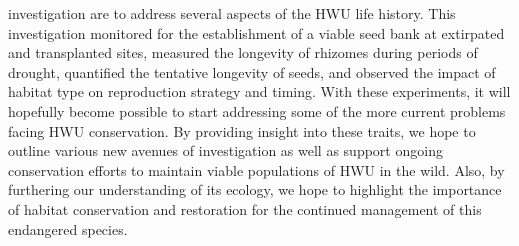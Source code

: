 \documentclass[twocolumn]{article}
\begin{document}
investigation are to address several aspects of the HWU life history. This investigation monitored for the establishment of a viable seed bank at extirpated and transplanted sites, measured the longevity of rhizomes during periods of drought, quantified the tentative longevity of seeds, and observed the impact of habitat type on reproduction strategy and timing. With these experiments, it will hopefully become possible to start addressing some of the more current problems facing HWU conservation. By providing insight into these traits, we hope to outline various new avenues of investigation as well as support ongoing conservation efforts to maintain viable populations of HWU in the wild. Also, by furthering our understanding of its ecology, we hope to highlight the importance of habitat conservation and restoration for the continued management of this endangered species.
\end{document}
